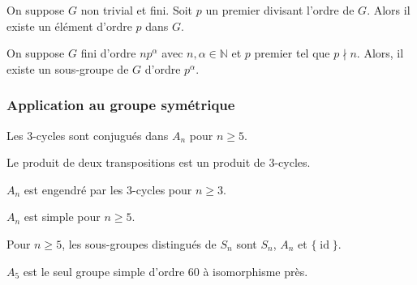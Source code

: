   \begin{application}
    On suppose $G$ non trivial et fini. Soit $p$ un premier divisant l'ordre de $G$. Alors il existe un élément d'ordre $p$ dans $G$.
  \end{application}


  \begin{application}
    On suppose $G$ fini d'ordre $n p^\alpha$ avec $n, \alpha \in \mathbb{N}$ et $p$ premier tel que $p \nmid n$. Alors, il existe un sous-groupe de $G$ d’ordre $p^\alpha$.
  \end{application}

  \subsubsection{Application au groupe symétrique}


  \begin{lemma}
    Les $3$-cycles sont conjugués dans $A_n$ pour $n \geq 5$.
  \end{lemma}


  \begin{lemma}
    Le produit de deux transpositions est un produit de $3$-cycles.
  \end{lemma}

  \begin{proposition}
    $A_n$ est engendré par les $3$-cycles pour $n \geq 3$.
  \end{proposition}


  \begin{theorem}
    $A_n$ est simple pour $n \geq 5$.
  \end{theorem}

  \begin{corollary}
    Pour $n \geq 5$, les sous-groupes distingués de $S_n$ sont $S_n$, $A_n$ et $\{\operatorname{id}\}$.
  \end{corollary}


  \begin{application}
    $A_5$ est le seul groupe simple d'ordre $60$ à isomorphisme près.
  \end{application}

